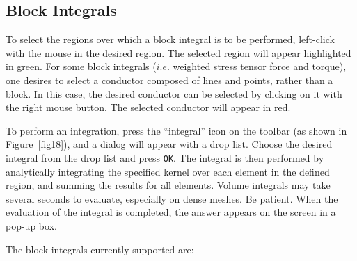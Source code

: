 \documentclass[12pt]{report}
\begin{document}
\subsection{Block Integrals}

To select the regions over which a block integral is to be performed,
left-click with the mouse in the desired region. The selected region will
appear highlighted in green. For some block integrals ($i.e.$ weighted stress
tensor force and torque), one desires to select a conductor composed of
lines and points, rather than a block. In this case, the desired conductor
can be selected by clicking on it with the right mouse button. The selected
conductor will appear in red.

To perform an integration, press the ``integral'' icon on the
toolbar (as shown in Figure~\ref{fig18}), and a dialog will appear
with a drop list. Choose the desired integral from the drop list
and press \texttt{OK}. The integral is then performed by
analytically integrating the specified kernel over each element in
the defined region, and summing the results for all elements.
Volume integrals may take several seconds to evaluate, especially
on dense meshes. Be patient. When the evaluation of the integral is
completed, the answer appears on the screen in a pop-up box.





The block integrals currently supported are:
\end{document}
